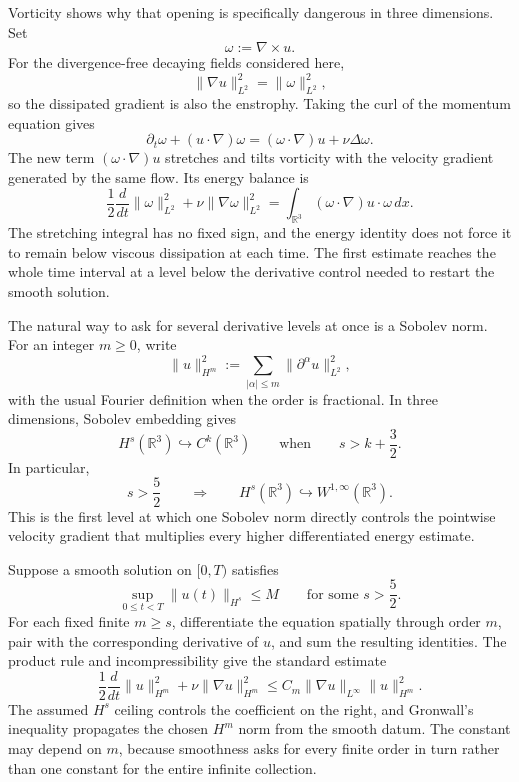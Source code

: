Vorticity shows why that opening is specifically dangerous in three dimensions.
Set
\[
  \omega:=\nabla\times u.
\]
For the divergence-free decaying fields considered here,
\[
  \lVert\nabla u\rVert_{L^2}^2
  =
  \lVert\omega\rVert_{L^2}^2,
\]
so the dissipated gradient is also the enstrophy.
Taking the curl of the momentum equation gives
\[
  \partial_t\omega+(u\cdot\nabla)\omega
  =
  (\omega\cdot\nabla)u+\nu\Delta\omega.
\]
The new term \((\omega\cdot\nabla)u\) stretches and tilts vorticity with the velocity gradient generated by the same flow.
Its energy balance is
\[
  \frac12\frac{d}{dt}\lVert\omega\rVert_{L^2}^2
  +
  \nu\lVert\nabla\omega\rVert_{L^2}^2
  =
  \int_{\mathbb R^3}(\omega\cdot\nabla)u\cdot\omega\,dx.
\]
The stretching integral has no fixed sign, and the energy identity does not force it to remain below viscous dissipation at each time.
The first estimate reaches the whole time interval at a level below the derivative control needed to restart the smooth solution.


The natural way to ask for several derivative levels at once is a Sobolev norm.
For an integer \(m\geq0\), write
\[
  \lVert u\rVert_{H^m}^2
  :=
  \sum_{|\alpha|\leq m}
  \lVert\partial^\alpha u\rVert_{L^2}^2,
\]
with the usual Fourier definition when the order is fractional.
In three dimensions, Sobolev embedding gives \parencite[Theorem~7.28]{Cerda2010}
\[
  H^s(\mathbb R^3)\hookrightarrow C^k(\mathbb R^3)
  \qquad
  \text{when}
  \qquad
  s>k+\frac32.
\]
In particular,
\[
  s>\frac52
  \qquad\Longrightarrow\qquad
  H^s(\mathbb R^3)\hookrightarrow W^{1,\infty}(\mathbb R^3).
\]
This is the first level at which one Sobolev norm directly controls the pointwise velocity gradient that multiplies every higher differentiated energy estimate.

Suppose a smooth solution on \([0,T)\) satisfies
\[
  \sup_{0\leq t<T}\lVert u(t)\rVert_{H^s}
  \leq M
  \qquad
  \text{for some }s>\frac52.
\]
For each fixed finite \(m\geq s\), differentiate the equation spatially through order \(m\), pair with the corresponding derivative of \(u\), and sum the resulting identities.
The product rule and incompressibility give the standard estimate
\[
  \frac12\frac{d}{dt}\lVert u\rVert_{H^m}^2
  +
  \nu\lVert\nabla u\rVert_{H^m}^2
  \leq
  C_m\lVert\nabla u\rVert_{L^\infty}
  \lVert u\rVert_{H^m}^2.
\]
The assumed \(H^s\) ceiling controls the coefficient on the right, and Gronwall's inequality propagates the chosen \(H^m\) norm from the smooth datum.
The constant may depend on \(m\), because smoothness asks for every finite order in turn rather than one constant for the entire infinite collection.

